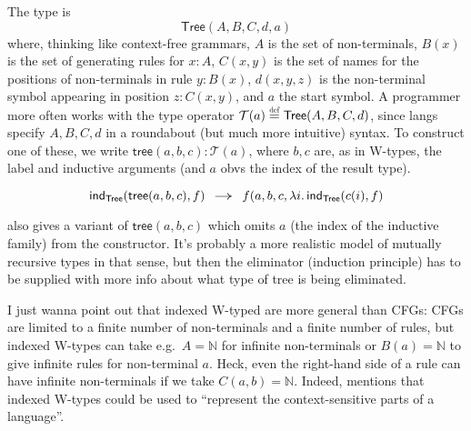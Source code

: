 \documentclass[11pt]{article} %
\theoremstyle{definition}
\theoremstyle{remark}
\begin{document}
The type is
  $$\mathsf{Tree}(A,B,C,d,a)$$
where, thinking like context-free grammars,
  $A$ is the set of non-terminals,
  $B(x)$ is the set of generating rules for $x : A$,
  $C(x, y)$ is the set of names for the positions of non-terminals in rule $y : B(x)$,
  $d(x,y,z)$ is the non-terminal symbol appearing in position $z : C(x, y)$, and
  $a$ the start symbol. \cite{petersson-synek_1989}
A programmer more often works with the type operator $\mathcal T(a) \defeq \mathsf{Tree}(A,B,C,d)$, since langs specify $A, B, C, d$ in a roundabout (but much more intuitive) syntax.
To construct one of these, we write $\mathsf{tree}(a,b,c) : \mathcal T(a)$, where $b, c$ are, as in W-types, the label and inductive arguments (and $a$ obvs the index of the result type).

\begin{mathprooftree}
\LeftLabel{$\Gamma\vdash$}
\end{mathprooftree}
$$\ind_\mathsf{Tree}(\mathsf{tree}(a,b,c), f)
  \reduceto
f(a,b,c, \fun{i}\ind_\mathsf{Tree}(c(i), f)$$

\cite{petersson-synek_1989} also gives a variant of $\mathsf{tree}(a,b,c)$ which omits $a$ (the index of the inductive family) from the constructor. It's probably a more realistic model of mutually recursive types in that sense, but then the eliminator (induction principle) has to be supplied with more info about what type of tree is being eliminated.

I just wanna point out that indexed W-typed are more general than CFGs: CFGs are limited to a finite number of non-terminals and a finite number of rules, but indexed W-types can take e.g.\ $A = \mathbb N$ for infinite non-terminals or $B(a) = \mathbb N$ to give infinite rules for non-terminal $a$.
Heck, even the right-hand side of a rule can have infinite non-terminals if we take $C(a,b) = \mathbb N$.
Indeed, \cite{petersson-synek_1989} mentions that indexed W-types could be used to ``represent the context-sensitive parts of a language''.
\end{document}
